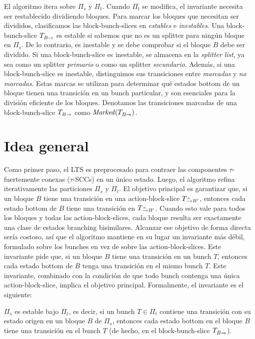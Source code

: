 El algoritmo itera sobre $\Pi_s$ y $\Pi_t$. Cuando $\Pi_t$ se modifica, el invariante necesita ser restablecido dividiendo bloques.
Para marcar los bloques que necesitan ser divididos, clasificamos las block-bunch-slices en \textit{estables} e \textit{inestables}.
Una block-bunch-slice $\TB$ es estable si sabemos que no es un splitter para ningún bloque en $\Pi_s$.
De lo contrario, es inestable y se debe comprobar si el bloque $B$ debe ser dividido.
Si una block-bunch-slice es inestable,
se almacena en la \emph{splitter list}, ya sea como un splitter \textit{primario} o como un splitter \textit{secundario}.
Además, si una block-bunch-slice es inestable, distinguimos sus transiciones entre \textit{marcadas} y \textit{no marcadas}.
Estas marcas se utilizan para determinar qué estados bottom de un bloque tienen una transición en un bunch particular, y son esenciales para la división eficiente de los bloques. Denotamos las transiciones marcadas de una block-bunch-slice $\TB$ como $\Marked(\TB)$.


\section{Idea general}
\label{sec:idea-general}

Como primer paso, el LTS es preprocesado para contraer las componentes $\tau$-fuertemente conexas ($\tau$-SCCs) en un único estado. Luego, el algoritmo refina iterativamente las particiones $\Pi_s$ y $\Pi_t$. El objetivo principal es garantizar que, si un bloque $B$ tiene una transición en una action-block-slice $\TaB$, entonces cada estado bottom de $B$ tiene una transición en $\TaB$. Cuando esto vale para todos los bloques y todas las action-block-slices, cada bloque resulta ser exactamente una clase de estados branching bisimilares. Alcanzar ese objetivo de forma directa sería costoso, así que el algoritmo mantiene en su lugar un invariante más débil, formulado sobre los bunches en vez de sobre las action-block-slices. Este invariante pide que, si un bloque $B$ tiene una transición en un bunch $T$, entonces cada estado bottom de $B$ tenga una transición en el mismo bunch $T$. Este invariante, combinado con la condición de que todo bunch contenga una única action-block-slice, implica el objetivo principal. Formalmente, el invariante es el siguiente:
\begin{invariante}[]\label{inv:bunches}$\Pi_s$ es estable bajo $\Pi_t$, es decir, si un bunch $T \in \Pi_t$ contiene una transición con su estado origen en un bloque $B$ de $\Pi_s$, entonces cada estado bottom en el bloque $B$ tiene una transición en el bunch $T$ (de hecho, en el block-bunch-slice $\TB$).\end{invariante}

